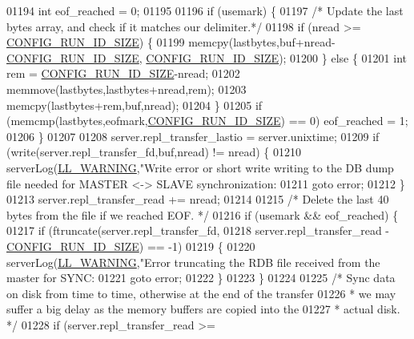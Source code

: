 \begin{DoxyCode}
{{{{{{{{{{{{{{{{{{{{{{{{{{{{{{{{{{{{{{{{{{{{{01194     \textcolor{keywordtype}{int} eof\_reached = 0;
01195 
01196     \textcolor{keywordflow}{if} (usemark) \{
01197         \textcolor{comment}{/* Update the last bytes array, and check if it matches our delimiter.*/}
01198         \textcolor{keywordflow}{if} (nread >= \hyperlink{server_8h_aba6794fa3ee28f85165eaed93190f1df}{CONFIG\_RUN\_ID\_SIZE}) \{
01199             memcpy(lastbytes,buf+nread-\hyperlink{server_8h_aba6794fa3ee28f85165eaed93190f1df}{CONFIG\_RUN\_ID\_SIZE},
      \hyperlink{server_8h_aba6794fa3ee28f85165eaed93190f1df}{CONFIG\_RUN\_ID\_SIZE});
01200         \} \textcolor{keywordflow}{else} \{
01201             \textcolor{keywordtype}{int} rem = \hyperlink{server_8h_aba6794fa3ee28f85165eaed93190f1df}{CONFIG\_RUN\_ID\_SIZE}-nread;
01202             memmove(lastbytes,lastbytes+nread,rem);
01203             memcpy(lastbytes+rem,buf,nread);
01204         \}
01205         \textcolor{keywordflow}{if} (memcmp(lastbytes,eofmark,\hyperlink{server_8h_aba6794fa3ee28f85165eaed93190f1df}{CONFIG\_RUN\_ID\_SIZE}) == 0) eof\_reached = 1;
01206     \}
01207 
01208     server.repl\_transfer\_lastio = server.unixtime;
01209     \textcolor{keywordflow}{if} (write(server.repl\_transfer\_fd,buf,nread) != nread) \{
01210         serverLog(\hyperlink{server_8h_a31229b9334bba7d6be2a72970967a14b}{LL\_WARNING},\textcolor{stringliteral}{"Write error or short write writing to the DB dump file needed
       for MASTER <-> SLAVE synchronization: %
01211         \textcolor{keywordflow}{goto} error;
01212     \}
01213     server.repl\_transfer\_read += nread;
01214 
01215     \textcolor{comment}{/* Delete the last 40 bytes from the file if we reached EOF. */}
01216     \textcolor{keywordflow}{if} (usemark && eof\_reached) \{
01217         \textcolor{keywordflow}{if} (ftruncate(server.repl\_transfer\_fd,
01218             server.repl\_transfer\_read - \hyperlink{server_8h_aba6794fa3ee28f85165eaed93190f1df}{CONFIG\_RUN\_ID\_SIZE}) == -1)
01219         \{
01220             serverLog(\hyperlink{server_8h_a31229b9334bba7d6be2a72970967a14b}{LL\_WARNING},\textcolor{stringliteral}{"Error truncating the RDB file received from the master for
       SYNC: %
01221             \textcolor{keywordflow}{goto} error;
01222         \}
01223     \}
01224 
01225     \textcolor{comment}{/* Sync data on disk from time to time, otherwise at the end of the transfer}
01226 \textcolor{comment}{     * we may suffer a big delay as the memory buffers are copied into the}
01227 \textcolor{comment}{     * actual disk. */}
01228     \textcolor{keywordflow}{if} (server.repl\_transfer\_read >=
}}}}}}}}}}}}}}}}}}}}}}}}}}}}}}}}}}}}}}}}}}}}}}}
\end{DoxyCode}
